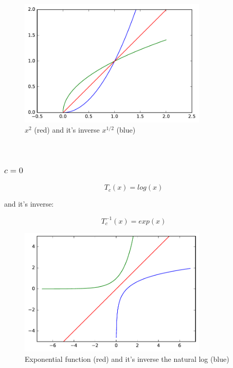 \documentclass[]{article}
\begin{document}
\begin{figure}[h!]
\centering
\includegraphics[width=0.8\textwidth]{figs/a_2_sgn_pow.pdf}
\caption{$x^2$ (red) and it's inverse $x^{1/2}$ (blue)}
\label{fig:sgn_pow_0_5}
\end{figure}

\pagebreak

\ \\

\pagebreak

\subsubsection{$c = 0$}

\[T_c(x) = log(x)  \]

and it's inverse:

\[T_c^{-1}(x) = exp(x) \]

\begin{figure}[h]
\centering
\includegraphics[width=0.8\textwidth]{figs/log_exp}
\caption{Exponential function (red) and it's inverse the natural log (blue)}
\label{fig:log_exp}
\end{figure}
\end{document}
